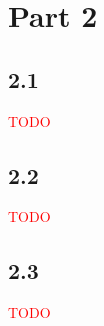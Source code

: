 \documentclass{article}
\begin{document}
\newpage
\section*{Part 2}

\subsection*{2.1}

\textcolor{red}{TODO}

\subsection*{2.2}

\textcolor{red}{TODO}

\subsection*{2.3}

\textcolor{red}{TODO}



























\newpage

 
\end{document}
